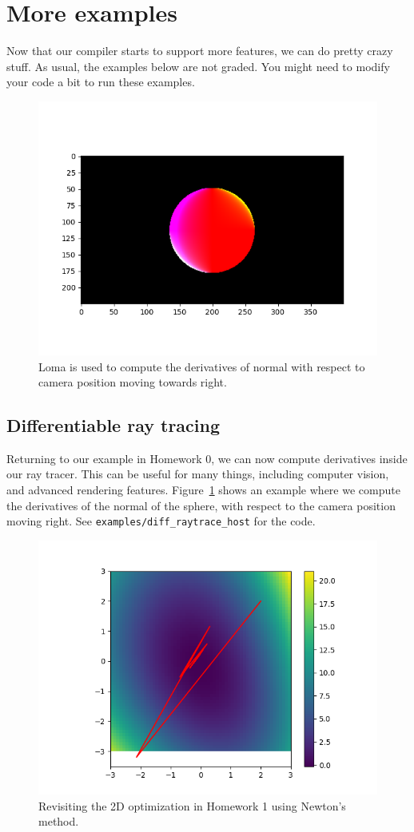 \section{More examples}
Now that our compiler starts to support more features, we can do pretty crazy stuff. As usual, the examples below are not graded. You might need to modify your code a bit to run these examples.

\begin{figure}
\centering
\includegraphics[width=0.8\linewidth]{imgs/diff-raytrace.png}
\vspace{-20pt}
\caption{Loma is used to compute the derivatives of normal with respect to camera position moving towards right.}
\label{fig:diffraytrace}
\end{figure}

\subsection{Differentiable ray tracing}
Returning to our example in Homework 0, we can now compute derivatives inside our ray tracer. This can be useful for many things, including computer vision, and advanced rendering features. Figure~\ref{fig:diffraytrace} shows an example where we compute the derivatives of the normal of the sphere, with respect to the camera position moving right. See \lstinline{examples/diff_raytrace_host} for the code.

\begin{figure}
\centering
\includegraphics[width=0.8\linewidth]{imgs/optimize-newton.png}
\vspace{-20pt}
\caption{Revisiting the 2D optimization in Homework 1 using Newton's method.}
\label{fig:newton}
\end{figure}

